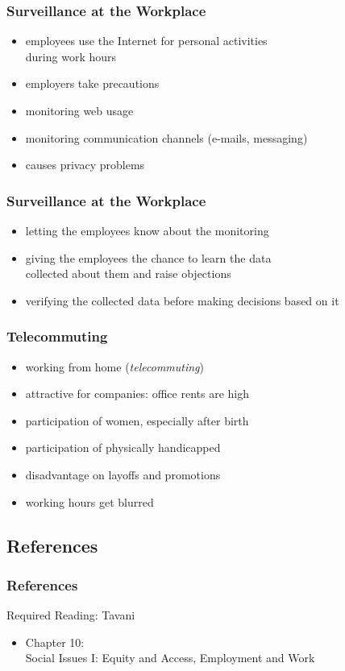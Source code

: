 \documentclass[dvipsnames]{beamer}
\theoremstyle{plain}
\begin{document}
\begin{frame}
  \frametitle{Surveillance at the Workplace}

  \begin{itemize}
    \item employees use the Internet for personal activities\\
      during work hours

    \medskip
    \item employers take precautions
    \smallskip
    \item monitoring web usage
    \item monitoring communication channels (e-mails, messaging)
    \item causes privacy problems
  \end{itemize}
\end{frame}

\begin{frame}
  \frametitle{Surveillance at the Workplace}

  \begin{itemize}
    \item letting the employees know about the monitoring
    \item giving the employees the chance to learn the data\\
      collected about them and raise objections
    \item verifying the collected data before making decisions based on it
  \end{itemize}
\end{frame}

\begin{frame}
  \frametitle{Telecommuting}

  \begin{itemize}
    \item working from home (\emph{telecommuting})
    \item attractive for companies: office rents are high

    \medskip
    \item participation of women, especially after birth
    \item participation of physically handicapped

    \pause
    \medskip
    \item disadvantage on layoffs and promotions
    \item working hours get blurred
  \end{itemize}
\end{frame}

\subsection*{References}

\begin{frame}
  \frametitle{References}

  \begin{block}{Required Reading: Tavani}
    \begin{itemize}
      \item Chapter 10:\\
        \alert{Social Issues I: Equity and Access, Employment and Work}
    \end{itemize}
  \end{block}
\end{frame}
\end{document}
